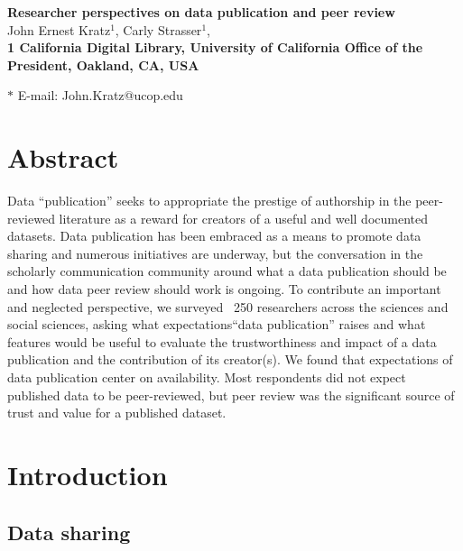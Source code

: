 \documentclass[10pt]{article}
\date{}
\begin{document}
\begin{flushleft}
{\Large
\textbf{Researcher perspectives on data publication and peer review}
}
\\
John Ernest Kratz$^{1}$, 
Carly Strasser$^{1}$, 
\\
\bf{1} California Digital Library, University of California Office of the President, Oakland, CA, USA

$\ast$ E-mail: John.Kratz@ucop.edu
\end{flushleft}


\section*{Abstract}

Data ``publication'' seeks to appropriate the prestige of authorship in the peer-reviewed literature as a reward for creators of a useful and well documented datasets. 
Data publication has been embraced as a means to promote data sharing and numerous initiatives are underway, but the conversation in the scholarly communication community around what a data publication should be and how data peer review should work is ongoing. 
To contribute an important and neglected perspective, we surveyed ~250 researchers across the sciences and social sciences, asking what expectations``data publication'' raises and what features would be useful to evaluate the trustworthiness and impact of a data publication and the contribution of its creator(s).  
We found that expectations of data publication center on availability.
Most respondents did not expect published data to be peer-reviewed, but peer review was the significant source of trust and value for a published dataset.


\section*{Introduction}

\subsection*{Data sharing}
\end{document}
